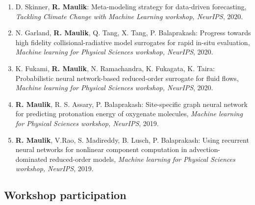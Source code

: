 \documentclass[letterpaper]{article}
\begin{document}
\begin{enumerate}

\item D. Skinner, \textbf{R. Maulik}: Meta-modeling strategy for data-driven forecasting, \textit{Tackling Climate Change with Machine Learning workshop, NeurIPS}, 2020.

\item N. Garland, \textbf{R. Maulik}, Q. Tang, X. Tang, P. Balaprakash: Progress towards high fidelity collisional-radiative model surrogates for rapid in-situ evaluation, \textit{Machine learning for Physical Sciences workshop, NeurIPS}, 2020.

\item K. Fukami, \textbf{R. Maulik}, N. Ramachandra, K. Fukagata, K. Taira: Probabilistic neural network-based reduced-order surrogate for fluid flows, \textit{Machine learning for Physical Sciences workshop, NeurIPS}, 2020.

\item \textbf{R. Maulik}, R. S. Assary, P. Balaprakash: Site-specific graph neural network for predicting protonation energy of oxygenate molecules, {\it Machine learning for Physical Sciences workshop, NeurIPS}, 2019.

\item \textbf{R. Maulik}, V.Rao, S. Madireddy, B. Lusch, P. Balaprakash: Using recurrent neural networks for nonlinear component computation in advection-dominated reduced-order models, \textit{Machine learning for Physical Sciences workshop, NeurIPS}, 2019.


\end{enumerate}

\subsection*{Workshop participation}
\end{document}
